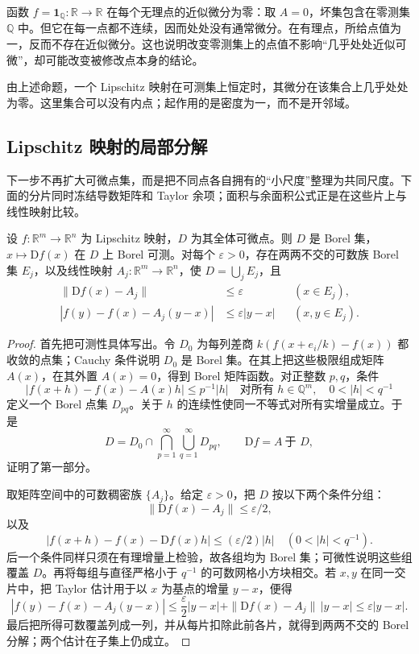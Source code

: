 \begin{example}\label{g3:exm:approximate-not-classical}
	函数 \(f=\mathbf1_{\mathbb Q}:\mathbb R\to\mathbb R\) 在每个无理点的近似微分为零：取 \(A=0\)，坏集包含在零测集 \(\mathbb Q\) 中。但它在每一点都不连续，因而处处没有通常微分。在有理点，所给点值为一，反而不存在近似微分。这也说明改变零测集上的点值不影响“几乎处处近似可微”，却可能改变被修改点本身的结论。
\end{example}

由上述命题，一个 Lipschitz 映射在可测集上恒定时，其微分在该集合上几乎处处为零。这里集合可以没有内点；起作用的是密度为一，而不是开邻域。

\subsection{Lipschitz 映射的局部分解}
\label{g3:subsec:2002:04}
下一步不再扩大可微点集，而是把不同点各自拥有的“小尺度”整理为共同尺度。下面的分片同时冻结导数矩阵和 Taylor 余项；面积与余面积公式正是在这些片上与线性映射比较。

\begin{theorem}\label{g3:thm:lipschitz-linearization-pieces}
	设 \(f:\mathbb R^m\to\mathbb R^n\) 为 Lipschitz 映射，\(D\) 为其全体可微点。则 \(D\) 是 Borel 集，\(x\mapsto\mathrm Df(x)\) 在 \(D\) 上 Borel 可测。对每个 \(\varepsilon>0\)，存在两两不交的可数族 Borel 集 \(E_j\)，以及线性映射 \(A_j:\mathbb R^m\to\mathbb R^n\)，使 \(D=\bigcup_jE_j\)，且
	\begin{align}
		\|\mathrm Df(x)-A_j\|&\le\varepsilon
		&& (x\in E_j),\label{g3:eq:piece-derivative-close}\\
		|f(y)-f(x)-A_j(y-x)|&\le\varepsilon|y-x|
		&& (x,y\in E_j).\label{g3:eq:piece-uniform-linearization}
	\end{align}
\end{theorem}
\begin{proof}
	首先把可测性具体写出。令 \(D_0\) 为每列差商
	\(k(f(x+e_i/k)-f(x))\) 都收敛的点集；Cauchy 条件说明 \(D_0\) 是 Borel 集。在其上把这些极限组成矩阵 \(A(x)\)，在其外置 \(A(x)=0\)，得到 Borel 矩阵函数。对正整数 \(p,q\)，条件
	\[
		|f(x+h)-f(x)-A(x)h|\le p^{-1}|h|
		\quad\text{对所有 }h\in\mathbb Q^m,\quad0<|h|<q^{-1}
	\]
	定义一个 Borel 点集 \(D_{pq}\)。关于 \(h\) 的连续性使同一不等式对所有实增量成立。于是
	\[
		D=D_0\cap\bigcap_{p=1}^\infty\bigcup_{q=1}^\infty D_{pq},
		\qquad \mathrm Df=A\ \text{于 }D,
	\]
	证明了第一部分。

	取矩阵空间中的可数稠密族 \(\{A_j\}\)。给定 \(\varepsilon>0\)，把 \(D\) 按以下两个条件分组：
	\[
		\|\mathrm Df(x)-A_j\|\le\varepsilon/2,
	\]
	以及
	\[
		|f(x+h)-f(x)-\mathrm Df(x)h|
		\le(\varepsilon/2)|h|
		\quad(0<|h|<q^{-1}).
	\]
	后一个条件同样只须在有理增量上检验，故各组均为 Borel 集；可微性说明这些组覆盖 \(D\)。再将每组与直径严格小于 \(q^{-1}\) 的可数网格小方块相交。若 \(x,y\) 在同一交片中，把 Taylor 估计用于以 \(x\) 为基点的增量 \(y-x\)，便得
	\[
		|f(y)-f(x)-A_j(y-x)|
		\le\frac\varepsilon2|y-x|
		 +\|\mathrm Df(x)-A_j\|\,|y-x|
		\le\varepsilon|y-x|.
	\]
	最后把所得可数覆盖列成一列，并从每片扣除此前各片，就得到两两不交的 Borel 分解；两个估计在子集上仍成立。
\end{proof}

